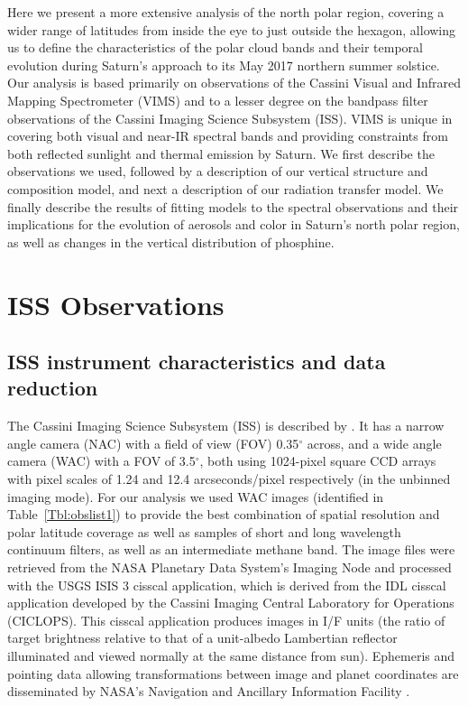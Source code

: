 \documentclass[article,11pt]{emulateapj}
\def\deg{$^\circ$ }
\def\degx{$^\circ$}
\begin{document}
Here we present a more extensive analysis of the north polar region,
covering a wider range of latitudes from inside the eye to just
outside the hexagon, allowing us to define the characteristics of the
polar cloud bands and their temporal evolution during Saturn's
approach to its May 2017 northern summer solstice.  Our analysis is based primarily on
observations of the Cassini Visual and Infrared Mapping Spectrometer
(VIMS) and to a lesser degree on the bandpass filter observations of
the Cassini Imaging Science Subsystem (ISS). VIMS is unique in covering
both visual and near-IR spectral bands and providing constraints from
both reflected sunlight and thermal emission by Saturn.  We first
describe the observations we used, followed by a description of our
vertical structure and composition model, and next a description of
our radiation transfer model.  We finally describe the results of
fitting models to the spectral observations and their implications for
the evolution of aerosols and color in Saturn's north polar region, as
well as changes in the vertical distribution of phosphine.

\section{ISS Observations}


\subsection{ISS instrument characteristics and data reduction}

The Cassini Imaging Science Subsystem (ISS) is described by
\cite{Porco2004SSR}.  It has a narrow angle camera (NAC) with a field
of view (FOV) 0.35\deg across, and a wide angle camera (WAC) with a FOV of
3.5\degx, both using 1024-pixel square CCD arrays with pixel scales of
1.24 and 12.4 arcseconds/pixel respectively (in the unbinned imaging
mode).  For our analysis we used WAC images (identified in
Table\ \ref{Tbl:obslist1}) to provide the best combination of 
spatial resolution and polar latitude coverage as well
as samples of short and long wavelength continuum filters,
as well as an intermediate methane band.  The image files were retrieved from the
NASA Planetary Data System’s Imaging Node and processed with the USGS
ISIS 3 cisscal application, which is derived from the IDL cisscal
application developed by the Cassini Imaging Central Laboratory for
Operations (CICLOPS). This cisscal application produces images in I/F
units (the ratio of target brightness relative to that of a
unit-albedo Lambertian reflector illuminated and viewed normally at
the same distance from sun). Ephemeris and pointing data allowing
transformations between image and planet coordinates are disseminated
by NASA's Navigation and Ancillary Information Facility
\citep{Acton1996}.
 
\end{document}
